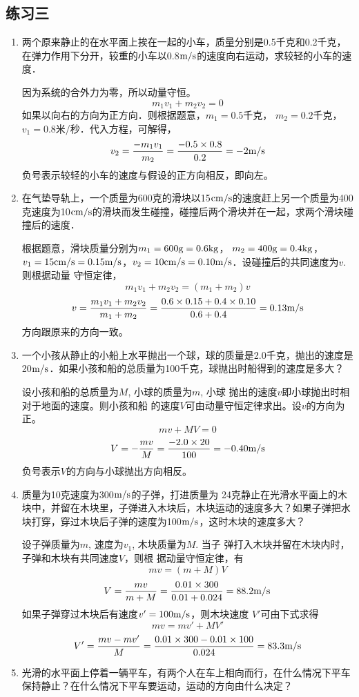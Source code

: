 \subsection{练习三}
\begin{enumerate}
    \item 两个原来静止的在水平面上挨在一起的小车，质量分别是0.5千克和0.2千克，在弹力作用下分开，较重的小车以0.8$\text{m}/\text{s}$的速度向右运动，求较轻的小车的速度．

    \begin{solution}
因为系统的合外力为零，所以动量守恒。
\[m_1v_1+m_2v_2=0\]
如果以向右的方向为正方向．则根据题意，$m_1=0.5$千克，
$m_2=0.2$千克，$v_1=0.8$米/秒．代入方程，可解得，
\[v_2=\frac{-m_1v_1}{m_2}=\frac{-0.5\times 0.8}{0.2}=-2\text{m}/\text{s}\]
负号表示较轻的小车的速度与假设的正方向相反，即向左。
    \end{solution}
    \item 在气垫导轨上，一个质量为600克的滑块以15${\rm cm}/{\rm s}$的速度赶上另一个质量为400克速度为10${\rm cm}/{\rm s}$的滑块而发生碰撞，碰撞后两个滑块并在一起，求两个滑块碰撞后的速度．

    \begin{solution}
根据题意，滑块质量分别为$m_1=600{\rm g}=0.6{\rm kg}$，
$m_2=400{\rm g}=0.4{\rm kg}$，$v_1=15{\rm cm/s}=0.15\text{m}/\text{s}$，$v_2=10{\rm cm/s}=0.10\text{m}/\text{s}$．设碰撞后的共同速度为$v$. 则根据动量
守恒定律，
\[m_1v_1+m_2v_2=(m_1+m_2)v\]
\[v=\frac{m_1v_1+m_2v_2}{m_1+m_2}=\frac{0.6\times 0.15+0.4\times 0.10}{0.6+0.4}=0.13\text{m}/\text{s}\]
方向跟原来的方向一致。
    \end{solution}
    \item 一个小孩从静止的小船上水平抛出一个球，球的质量是2.0千克，抛出的速度是20$\text{m}/\text{s}$．如果小孩和船的总质量为100千克，球抛出时船得到的速度是多大？

    \begin{solution}
    设小孩和船的总质量为$M$, 小球的质量为$m$, 小球
抛出的速度$v$即小球抛出时相对于地面的速度。则小孩和船
的速度$V$可由动量守恒定律求出。设$v$的方向为正。
\[mv+MV=0\]
\[V=-\frac{mv}{M}=\frac{-2.0\times 20}{100}=-0.40\text{m}/\text{s}\]
负号表示$V$的方向与小球抛出方向相反。
    \end{solution}
    \item 质量为10克速度为300$\text{m}/\text{s}$的子弹，打进质量为
    24克静止在光滑水平面上的木块中，并留在木块里，子弹进入木块后，木块运动的速度多大？如果子弹把水块打穿，穿过木块后子弹的速度为100$\text{m}/\text{s}$，这时木块的速度多大？

    \begin{solution}
    设子弹质量为$m$, 速度为$v_1$, 木块质量为$M$. 当子
弹打入木块并留在木块内时，子弹和木块有共同速度$V$，则根
据动量守恒定律，有
\[mv=(m+M)V\]
\[V=\frac{mv}{m+M}=\frac{0.01\times 300}{0.01+0.024}=88.2\text{m}/\text{s}\]
如果子弹穿过木块后有速度$v'=100\text{m}/\text{s}$，则木块速度
$V'$可由下式求得
\[mv= mv'+ MV'\]
\[V'=\frac{mv-mv'}{M}=\frac{0.01\times300-0.01\times100}{0.024}=83.3\text{m}/\text{s}\]
    \end{solution}
    \item 光滑的水平面上停着一辆平车，有两个人在车上相向而行，在什么情况下平车保持静止？在什么情况下平车要运动，运动的方向由什么决定？


\end{enumerate}

